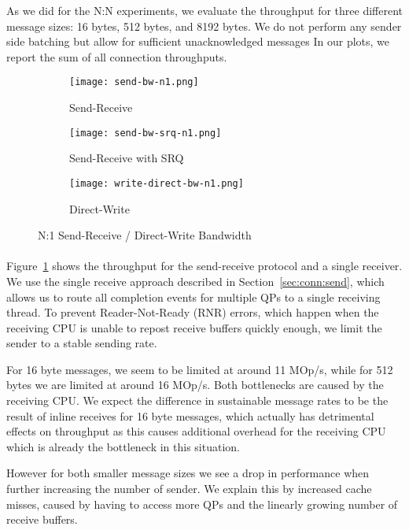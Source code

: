 As we did for the N:N experiments, we evaluate the throughput for three different message sizes: 16 bytes, 
512 bytes, and 8192 bytes. We do not perform any sender side batching but allow for sufficient unacknowledged messages 
In our plots, we report the sum of all connection throughputs.


\begin{figure}[ht]
  \centering
\begin{subfigure}[b]{0.49\textwidth}
  \centering
  \texttt{[image: send-bw-n1.png]}
  \caption{Send-Receive}
  \label{fig:plot-sndrcv-bw-n1-nosrq}
\end{subfigure}
\begin{subfigure}[b]{0.49\textwidth}
  \centering
  \texttt{[image: send-bw-srq-n1.png]}
  \caption{Send-Receive with SRQ}
  \label{fig:plot-sndrcv-bw-n1-srq}
\end{subfigure}
  \begin{subfigure}[b]{0.48\textwidth}
  \centering
  \texttt{[image: write-direct-bw-n1.png]}
  \caption{Direct-Write}
  \label{fig:plot-wdir-bw-n1}
  \end{subfigure}
\caption{N:1 Send-Receive / Direct-Write Bandwidth}
  \label{fig:plot-sndrcv-bw-n1}
\end{figure}



\paragraph{} Figure~\ref{fig:plot-sndrcv-bw-n1-nosrq} shows the throughput for the send-receive protocol and a single receiver. We
use the single receive approach described in Section~\ref{sec:conn:send}, which allows us to route all completion events for 
multiple QPs to a single receiving thread. To prevent Reader-Not-Ready (RNR) errors, which happen when the receiving CPU is 
unable to repost receive buffers quickly enough, we limit the sender to a stable sending rate.

For 16 byte messages, we seem to be limited at around 11 MOp/s, while for 512 bytes we are limited at around 16 MOp/s. Both bottlenecks
are caused by the receiving CPU. We expect the difference in sustainable message rates to be the result of inline receives for 
16 byte messages, which actually has detrimental effects on throughput as this causes additional overhead for the receiving 
CPU which 
is already the bottleneck in this situation.

However for both smaller message sizes we see a drop in performance when further increasing the number of sender. We explain 
this by increased cache misses, caused by having to access more QPs and the linearly growing number of receive buffers.

